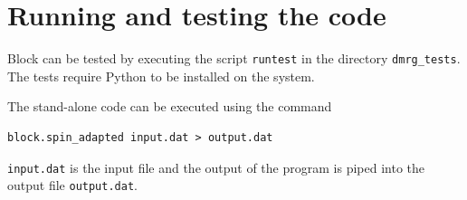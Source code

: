 \documentclass[letterpaper,12pt,aps, pra]{revtex4-1}
\begin{document}
\section{Running and testing the code}
Block can be tested by executing the script \texttt{runtest} in the  directory \texttt{dmrg\_tests}. The tests require Python to be installed on the system.

The stand-alone code can be executed using the command
\begin{verbatim}
block.spin_adapted input.dat > output.dat
\end{verbatim}
\texttt{input.dat} is the input file and the output of the program is piped 
into the output file \texttt{output.dat}.














\end{document}
